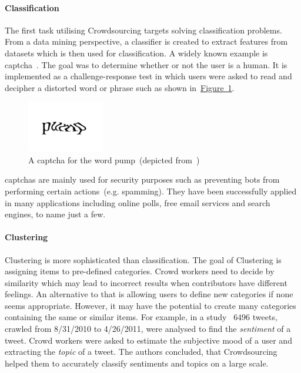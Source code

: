 \paragraph{Classification} The first task utilising Crowdsourcing targets solving classification problems. From a data mining perspective, a classifier is created to extract features from datasets which is then used for classification. A widely known example is \gls{captcha}~\cite{ahn2003}. The goal was to determine whether or not the user is a human. 
It is implemented as a challenge-response test in which users were asked to read and decipher a distorted word or phrase such as shown in~\hyperref[fig:captcha]{Figure~\ref*{fig:captcha}}.
\begin{figure}
	 \centering
	 \includegraphics[width=0.3\textwidth]{drawio/CAPCHA}
	 \caption{A \gls{captcha} for the word \guillemotright pump\guillemotleft~(depicted from~\cite{ahn2003})}\label{fig:captcha}
\end{figure}  
\gls{captcha}s are mainly used for security purposes such as preventing bots from performing certain actions~(e.g. spamming). They have been successfully applied in many applications including online polls, free email services and search engines, to name just a few. 

\paragraph{Clustering} Clustering is more sophisticated than classification. The goal of Clustering is assigning items to
pre-defined categories. Crowd workers need to decide by similarity which may lead to incorrect results when contributors have different feelings. An alternative to that is allowing users to define new categories if none seems appropriate. However, it may have the potential to create many categories containing the same or similar items. For example, in a study~\cite{huang2013} $6496$ tweets, crawled from 8/31/2010 to 4/26/2011, were analysed to find the \emph{sentiment} of a tweet. Crowd workers were asked to estimate the subjective mood of a user and extracting the \emph{topic} of a tweet. The authors concluded, that Crowdsourcing helped them to accurately classify sentiments and topics on a large scale. 

